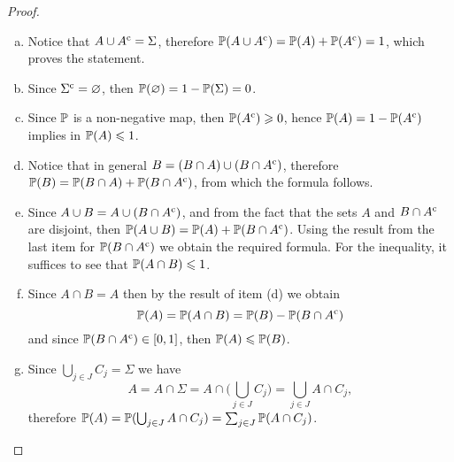 \begin{proof}
\begin{enumerate}[(a)]\setlength\itemsep{0em}
\item Notice that \(A \cup {A}^{\text{c}} = \Sigma\), therefore \(\operatorname{\mathbb{P}}(A \cup
  {A}^{\text{c}}) = \operatorname{\mathbb{P}}(A) + \operatorname{\mathbb{P}}({A}^{\text{c}}) = 1\), which proves the statement.

\item Since \({\Sigma}^{\text{c}} = \varnothing\), then
  \(\operatorname{\mathbb{P}}(\varnothing) = 1 - \operatorname{\mathbb{P}}(\Sigma) = 0\).

\item Since \(\operatorname{\mathbb{P}}\) is a non-negative map, then \(\operatorname{\mathbb{P}}({A}^{\text{c}}) \geqslant 0\),
  hence \(\operatorname{\mathbb{P}}(A) = 1 - \operatorname{\mathbb{P}}({A}^{\text{c}})\) implies in \(\operatorname{\mathbb{P}}(A) \leqslant 1\).

\item Notice that in general \(B = (B \cap A) \cup (B \cap {A}^{\text{c}})\),
  therefore \(\operatorname{\mathbb{P}}(B) = \operatorname{\mathbb{P}}(B \cap A) + \operatorname{\mathbb{P}}(B \cap {A}^{\text{c}})\), from which
  the formula follows.

\item Since \(A \cup B = A \cup (B \cap {A}^{\text{c}})\), and from the fact that the
  sets \(A\) and \(B \cap {A}^{\text{c}}\) are disjoint, then
  \(\operatorname{\mathbb{P}}(A \cup B) = \operatorname{\mathbb{P}}(A) + \operatorname{\mathbb{P}}(B \cap {A}^{\text{c}})\). Using the result from
  the last item for \(\operatorname{\mathbb{P}}(B \cap {A}^{\text{c}})\) we obtain the required
  formula. For the inequality, it suffices to see that \(\operatorname{\mathbb{P}}(A \cap B) \leqslant 1\).

\item Since \(A \cap B = A\) then by the result of item (d) we obtain
  \[
  \operatorname{\mathbb{P}}(A) = \operatorname{\mathbb{P}}(A \cap B) = \operatorname{\mathbb{P}}(B) - \operatorname{\mathbb{P}}(B \cap {A}^{\text{c}})
  \]
  and since \(\operatorname{\mathbb{P}}(B \cap {A}^{\text{c}}) \in [0, 1]\), then
  \(\operatorname{\mathbb{P}}(A) \leqslant \operatorname{\mathbb{P}}(B)\).

\item Since \(\bigcup_{j \in J} C_j = \Sigma\) we have
  \[
  A = A \cap \Sigma = A \cap \Big( \bigcup_{j \in J} C_j \Big)
  = \bigcup_{j \in J} A \cap C_j,
  \]
  therefore \(\operatorname{\mathbb{P}}(A) = \operatorname{\mathbb{P}}(\bigcup_{j \in J} A \cap C_j) = \sum_{j \in J}
  \operatorname{\mathbb{P}}(A \cap C_j)\).


\end{enumerate}
\end{proof}
